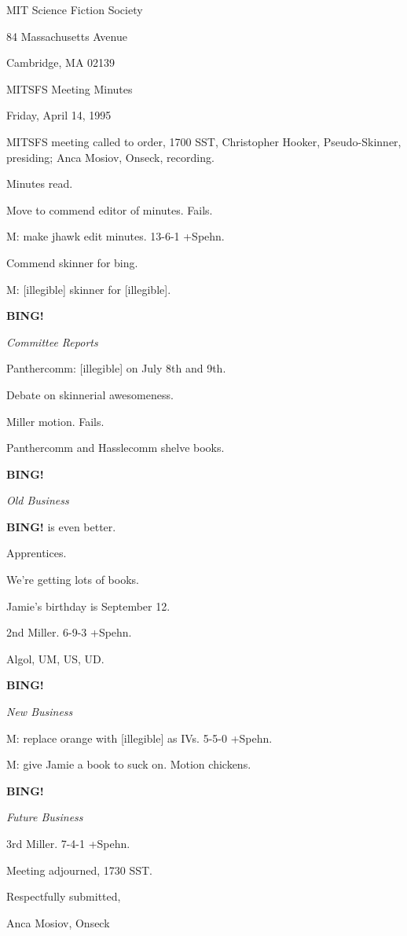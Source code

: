 \documentclass[12pt]{article}
\newcommand{\bing}{{\bf BING!} }
\newcommand{\goto}[1]{\bing \vskip 12pt \centerline{{\em{#1}}}}
\begin{document}
\begin{center}

MIT Science Fiction Society 

84 Massachusetts Avenue

Cambridge, MA 02139

\vspace{12pt}

MITSFS Meeting Minutes 

Friday, April 14, 1995

\end{center}
 
\vspace{18pt}

\setlength{\parskip}{6pt}

\noindent
MITSFS meeting called to order, 1700 SST,
Christopher Hooker, Pseudo-Skinner, presiding; Anca Mosiov, Onseck, recording.

Minutes read.

Move to commend editor of minutes. Fails.

M: make jhawk edit minutes. 13-6-1 +Spehn.

Commend skinner for bing.

M: [illegible] skinner for [illegible].

\goto{Committee Reports}

Panthercomm: [illegible] on July 8th and 9th.

Debate on skinnerial awesomeness.

Miller motion. Fails.

Panthercomm and Hasslecomm shelve books.

\goto{Old Business}

\bing is even better.

Apprentices.

We're getting lots of books.

Jamie's birthday is September 12.

2nd Miller. 6-9-3 +Spehn.

Algol, UM, US, UD.

\goto{New Business}

M: replace orange with [illegible] as IVs. 5-5-0 +Spehn.

M: give Jamie a book to suck on. Motion chickens.

\goto{Future Business}

3rd Miller. 7-4-1 +Spehn.

\vspace{12pt}

\noindent
Meeting adjourned, 1730 SST.

\vspace{18pt}

\centerline{Respectfully submitted,}
\centerline{Anca Mosiov, Onseck}
\end{document}
